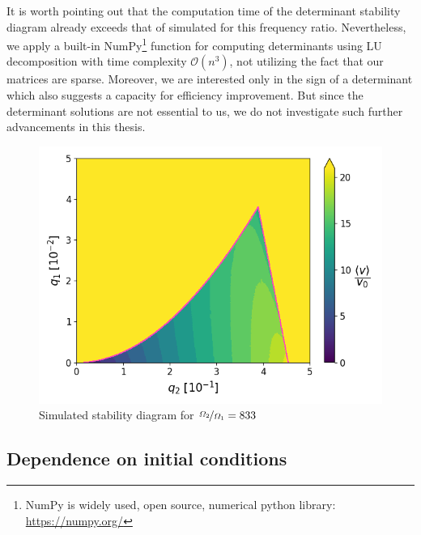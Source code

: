 It is worth pointing out that the computation time of the determinant stability diagram already exceeds that of simulated for this frequency ratio. Nevertheless, we apply a built-in NumPy\footnote{NumPy is widely used, open source, numerical python library: \href{https://numpy.org}{https://numpy.org/}} function for computing determinants using LU decomposition \cite{teukolsky1992numerical} with time complexity $\mathcal{O}(n^3)$, not utilizing the fact that our matrices are sparse. Moreover, we are interested only in the sign of a determinant which also suggests a capacity for efficiency improvement. But since the determinant solutions are not essential to us, we do not investigate such further advancements in this thesis.

\begin{figure}[H]
	\centering
	\includegraphics[width=\linewidth]{img/0_ions_1_electrons_q1_0.0-0.05_q2_0.0-0.5_960x960_833_1000.png}
	\caption{Simulated stability diagram for $\nicefrac{\Omega_2}{\Omega_1} = 833$}
	\label{fig:stabil-eta=833}
\end{figure}

\subsection{Dependence on initial conditions}


